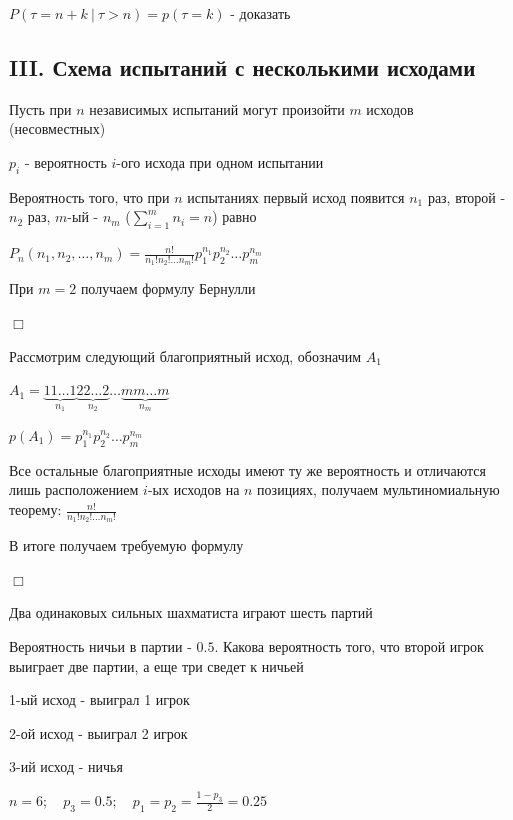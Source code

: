 \documentclass[12pt]{article}
\begin{document}
    \Nota $P(\tau = n + k \ | \ \tau > n) = p(\tau = k)$ - \Lab доказать

    \subsection{III. Схема испытаний с несколькими исходами}

    Пусть при $n$ независимых испытаний могут произойти $m$ исходов (несовместных)

    $p_i$ - вероятность $i$-ого исхода при одном испытании

    \begin{MyTheorem}
        \Ths Вероятность того, что при $n$ испытаниях первый исход появится $n_1$ раз, второй - $n_2$ раз, $m$-ый - $n_m$ ($\sum_{i = 1}^m n_i = n$)
        равно

        $P_n(n_1, n_2, \dots, n_m) = \frac{n!}{n_1! n_2! \dots n_m!} p_1^{n_1} p_2^{n_2} \dots p_m^{n_m}$
    \end{MyTheorem}

    При $m = 2$ получаем формулу Бернулли

    \begin{MyProof}
        $\Box$

        Рассмотрим следующий благоприятный исход, обозначим $A_1$

        $A_1 = \underset{n_1}{\underbrace{11\dots1}}\underset{n_2}{\underbrace{22\dots2}}\dots\underset{n_m}{\underbrace{mm\dots m}}$

        $p(A_1) = p_1^{n_1} p_2^{n_2} \dots p_m^{n_m}$

        Все остальные благоприятные исходы имеют ту же вероятность и отличаются лишь расположением $i$-ых исходов на $n$ позициях,
        получаем мультиномиальную теорему: $\frac{n!}{n_1! n_2! \dots n_m!}$

        В итоге получаем требуемую формулу

        $\Box$
    \end{MyProof}

    \Ex Два одинаковых сильных шахматиста играют шесть партий

    Вероятность ничьи в партии - $0.5$. Какова вероятность того, что второй игрок выиграет две партии, а еще три сведет к ничьей

    1-ый исход - выиграл 1 игрок

    2-ой исход - выиграл 2 игрок

    3-ий исход - ничья

    $n = 6; \quad p_3 = 0.5; \quad p_1 = p_2 = \frac{1 - p_3}{2} = 0.25$
\end{document}
